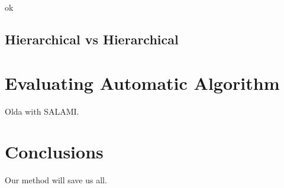 \documentclass{article}
\begin{document}
ok

\subsection{Hierarchical vs Hierarchical}

\section{Evaluating Automatic Algorithm}

Olda\cite{McFee2014} with SALAMI.




\section{Conclusions}

Our method will save us all.



%
\end{document}
